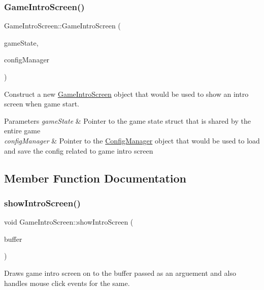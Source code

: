 \subsubsection{\texorpdfstring{GameIntroScreen()}{GameIntroScreen()}}
{\footnotesize\ttfamily Game\+Intro\+Screen\+::\+Game\+Intro\+Screen (\begin{DoxyParamCaption}\item[{\mbox{\hyperlink{struct_game_state}{Game\+State}} $\ast$}]{game\+State,  }\item[{\mbox{\hyperlink{class_config_manager}{Config\+Manager}} $\ast$}]{config\+Manager }\end{DoxyParamCaption})}



Construct a new \mbox{\hyperlink{class_game_intro_screen}{Game\+Intro\+Screen}} object that would be used to show an intro screen when game start. 


\begin{DoxyParams}{Parameters}
{\em game\+State} & Pointer to the game state struct that is shared by the entire game \\
\hline
{\em config\+Manager} & Pointer to the \mbox{\hyperlink{class_config_manager}{Config\+Manager}} object that would be used to load and save the config related to game intro screen \\
\hline
\end{DoxyParams}


\subsection{Member Function Documentation}
\mbox{\label{class_game_intro_screen_a86a225012009cea900efe9010e7520f5}} 
\subsubsection{\texorpdfstring{showIntroScreen()}{showIntroScreen()}}
{\footnotesize\ttfamily void Game\+Intro\+Screen\+::show\+Intro\+Screen (\begin{DoxyParamCaption}\item[{B\+I\+T\+M\+AP $\ast$}]{buffer }\end{DoxyParamCaption})}



Draws game intro screen on to the buffer passed as an arguement and also handles mouse click events for the same. 


